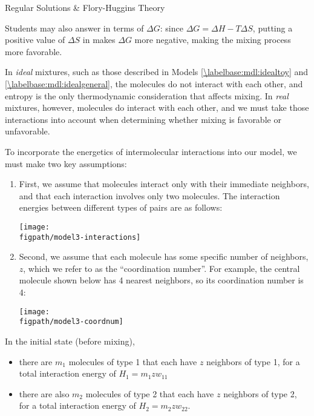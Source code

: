 \begin{activity}{Regular Solutions \& Flory-Huggins Theory}
\begin{ctqs}
\begin{solution}[2.5in]
			Students may also answer in terms of $\Delta G$: since $\Delta G = \Delta H - T\Delta S$, putting a positive value of $\Delta S$ in makes $\Delta G$ more negative, making the mixing process more favorable.
		\end{solution}
		
\end{ctqs}
	

\begin{model}
\label{\labelbase:mdl:regular}

In \emph{ideal} mixtures, such as those described in Models \ref{\labelbase:mdl:idealtoy} and \ref{\labelbase:mdl:idealgeneral}, the molecules do not interact with each other, and entropy is the only thermodynamic consideration that affects mixing.
In \emph{real} mixtures, however, molecules do interact with each other, and we must take those interactions into account when determining whether mixing is favorable or unfavorable.

To incorporate the energetics of intermolecular interactions into our model, we must make two key assumptions:
\begin{enumerate}
	\item First, we assume that molecules interact only with their immediate neighbors, and that each interaction involves only two molecules.  The interaction energies between different types of pairs are as follows:

\centerline{\texttt{[image: \\figpath/model3-interactions]}}
	
	\item Second, we assume that each molecule has some specific number of neighbors, $z$, which we refer to as the ``coordination number''.  For example, the central molecule shown below has 4 nearest neighbors, so its coordination number is 4:

\centerline{\texttt{[image: \\figpath/model3-coordnum]}}


\end{enumerate}

\end{model}

\begin{ctqs}

	\question In the initial state (before mixing), 
		\begin{itemize}[itemsep=0pt,topsep=3pt]
			\item there are $m_1$ molecules of type 1 that each have $z$ neighbors of type 1, for a total interaction energy of $H_{1} = m_1 z w_{11}$
			\item there are also $m_2$ molecules of type 2 that each have $z$ neighbors of type 2, for a total interaction energy of $H_{2} = m_2 z w_{22}$.
		\end{itemize}
		

\end{ctqs}
\end{activity}
